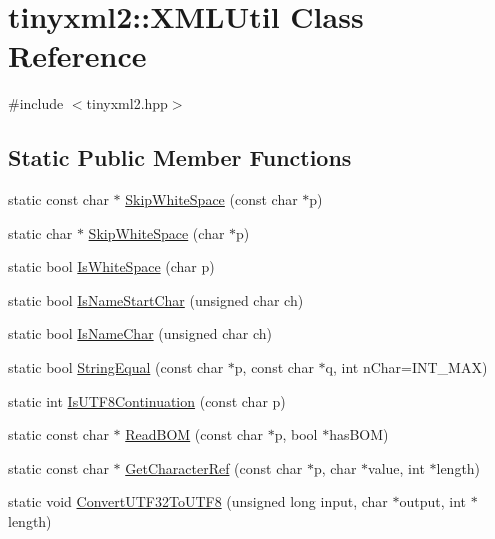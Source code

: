 \hypertarget{classtinyxml2_1_1_x_m_l_util}{\section{tinyxml2\-:\-:X\-M\-L\-Util Class Reference}
\label{classtinyxml2_1_1_x_m_l_util}
}


{\ttfamily \#include $<$tinyxml2.\-hpp$>$}

\subsection*{Static Public Member Functions}
\begin{DoxyCompactItemize}
\item 
static const char $\ast$ \hyperlink{classtinyxml2_1_1_x_m_l_util_a9333d20f2a34325b5115ca45849c4b2a}{Skip\-White\-Space} (const char $\ast$p)
\item 
static char $\ast$ \hyperlink{classtinyxml2_1_1_x_m_l_util_aa48025be8843ec5a79b65579d31bd8fc}{Skip\-White\-Space} (char $\ast$p)
\item 
static bool \hyperlink{classtinyxml2_1_1_x_m_l_util_a357ec3af8fc433d19023a815f45e8e33}{Is\-White\-Space} (char p)
\item 
static bool \hyperlink{classtinyxml2_1_1_x_m_l_util_abe106a69ac4d942a4381a4d9dfd0e0bd}{Is\-Name\-Start\-Char} (unsigned char ch)
\item 
static bool \hyperlink{classtinyxml2_1_1_x_m_l_util_a04b17341538fa11752f24b4301d19485}{Is\-Name\-Char} (unsigned char ch)
\item 
static bool \hyperlink{classtinyxml2_1_1_x_m_l_util_acfcd287cacfd2533e1bc9ea4dfb56602}{String\-Equal} (const char $\ast$p, const char $\ast$q, int n\-Char=I\-N\-T\-\_\-\-M\-A\-X)
\item 
static int \hyperlink{classtinyxml2_1_1_x_m_l_util_a24ba87b1d22528167a3d16c4f52096bf}{Is\-U\-T\-F8\-Continuation} (const char p)
\item 
static const char $\ast$ \hyperlink{classtinyxml2_1_1_x_m_l_util_ae9bcb2bc3cd6475fdc644c8c17790555}{Read\-B\-O\-M} (const char $\ast$p, bool $\ast$has\-B\-O\-M)
\item 
static const char $\ast$ \hyperlink{classtinyxml2_1_1_x_m_l_util_a5a96e5144a8d693dc4bcd783d9964648}{Get\-Character\-Ref} (const char $\ast$p, char $\ast$value, int $\ast$length)
\item 
static void \hyperlink{classtinyxml2_1_1_x_m_l_util_a31c00d5c5dfb38382de1dfcaf4be3595}{Convert\-U\-T\-F32\-To\-U\-T\-F8} (unsigned long input, char $\ast$output, int $\ast$length)

\end{DoxyCompactItemize}
